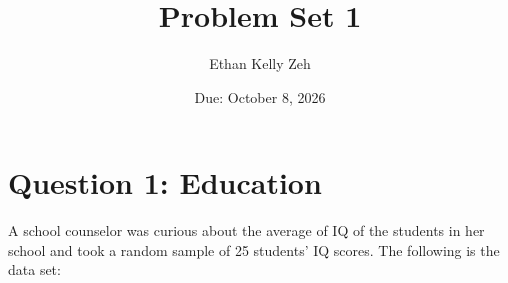 \documentclass[12pt,letterpaper]{article}
\title{Problem Set 1}
\date{Due: October 8, 2026}
\author{Ethan Kelly Zeh}
\begin{document}
\maketitle

\section*{Question 1: Education}

A school counselor was curious about the average of IQ of the students in her school and took a random sample of 25 students' IQ scores. The following is the data set:\\
\vspace{.5cm}

  


\vspace{1cm}
\end{document}
